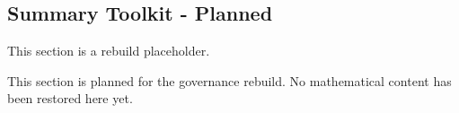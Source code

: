 \subsection*{Summary Toolkit - Planned}

This section is a rebuild placeholder.

This section is planned for the governance rebuild. No mathematical content has
been restored here yet.
